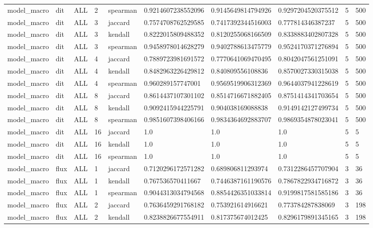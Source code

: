 \begin{tabular}{llllllllll}
model\_macro & dit & ALL & 2 & spearman & 0.9214607238552096 & 0.9145649814794926 & 0.9297204520375512 & 5 & 500 \\
model\_macro & dit & ALL & 3 & jaccard & 0.7574708762529585 & 0.7417392344516003 & 0.777814346387237 & 5 & 500 \\
model\_macro & dit & ALL & 3 & kendall & 0.8222015809488352 & 0.8120255068166509 & 0.8338883402807328 & 5 & 500 \\
model\_macro & dit & ALL & 3 & spearman & 0.9458978014628279 & 0.9402788613475779 & 0.9524170371276894 & 5 & 500 \\
model\_macro & dit & ALL & 4 & jaccard & 0.7889723981691572 & 0.7770641069470495 & 0.8042047561251091 & 5 & 500 \\
model\_macro & dit & ALL & 4 & kendall & 0.8482963226429812 & 0.840809556108836 & 0.8570027330315038 & 5 & 500 \\
model\_macro & dit & ALL & 4 & spearman & 0.960289157747001 & 0.9569519906312369 & 0.9644037941228619 & 5 & 500 \\
model\_macro & dit & ALL & 8 & jaccard & 0.8614437107301102 & 0.8514716671882405 & 0.8751414341703654 & 5 & 500 \\
model\_macro & dit & ALL & 8 & kendall & 0.9092415944225791 & 0.904038169088838 & 0.9149142127499734 & 5 & 500 \\
model\_macro & dit & ALL & 8 & spearman & 0.9851607398406166 & 0.9834364692883707 & 0.9869354878023041 & 5 & 500 \\
model\_macro & dit & ALL & 16 & jaccard & 1.0 & 1.0 & 1.0 & 5 & 5 \\
model\_macro & dit & ALL & 16 & kendall & 1.0 & 1.0 & 1.0 & 5 & 5 \\
model\_macro & dit & ALL & 16 & spearman & 1.0 & 1.0 & 1.0 & 5 & 5 \\
model\_macro & flux & ALL & 1 & jaccard & 0.7120296172571282 & 0.689806811293974 & 0.7312286457707904 & 3 & 36 \\
model\_macro & flux & ALL & 1 & kendall & 0.767536570411667 & 0.7446387161190576 & 0.7867822934716872 & 3 & 36 \\
model\_macro & flux & ALL & 1 & spearman & 0.9044313034794568 & 0.8854426351033814 & 0.9199817581585186 & 3 & 36 \\
model\_macro & flux & ALL & 2 & jaccard & 0.7636459291768182 & 0.753921614916621 & 0.773784287838069 & 3 & 198 \\
model\_macro & flux & ALL & 2 & kendall & 0.8238826677554911 & 0.817375674012425 & 0.8296179891345165 & 3 & 198 \\

\end{tabular}
